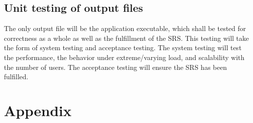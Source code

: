 \documentclass[12pt, titlepage]{article}
\begin{document}
\subsection{Unit testing of output files}       
The only output file will be the application executable, which shall be tested for correctness as a whole as well as the fulfillment of the SRS. This testing will take the form of system testing and acceptance testing. The system testing will test the performance, the behavior under extreme/varying load, and scalability with the number of users. The acceptance testing will ensure the SRS has been fulfilled.



\newpage

\section{Appendix}


\end{document}
